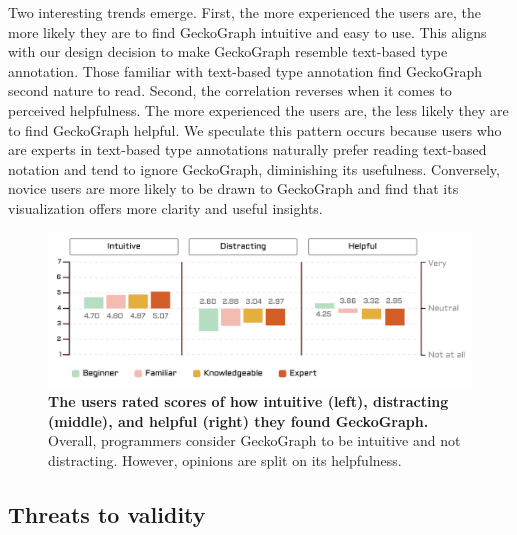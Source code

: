 \documentclass[preprint,12pt]{elsarticle}
\begin{document}
Two interesting trends emerge. First, the more experienced the users are, the more likely they are to find GeckoGraph intuitive and easy to use. This aligns with our design decision to make GeckoGraph resemble text-based type annotation. Those familiar with text-based type annotation find GeckoGraph second nature to read. Second, the correlation reverses when it comes to perceived helpfulness. The more experienced the users are, the less likely they are to find GeckoGraph helpful. We speculate this pattern occurs because users who are experts in text-based type annotations naturally prefer reading text-based notation and tend to ignore GeckoGraph, diminishing its usefulness. Conversely, novice users are more likely to be drawn to GeckoGraph and find that its visualization offers more clarity and useful insights.




\begin{figure}[]
  \includegraphics[width=\linewidth]{figures/Qualitative}
  \caption{\label{fig:qualitative} {\bf The users rated scores of how intuitive (left), distracting (middle), and helpful (right) they found GeckoGraph.} Overall, programmers consider GeckoGraph to be intuitive and not distracting. However, opinions are split on its helpfulness. }
\end{figure}

\subsection{Threats to validity}
\end{document}
